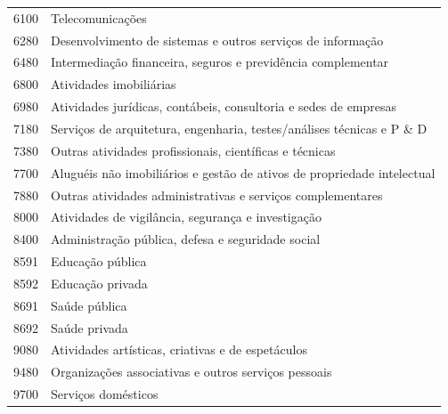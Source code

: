 \begin{longtable}{@{}lp{}@{}}
6100 & Telecomunicações \\
6280 & Desenvolvimento de sistemas e outros serviços de informação \\
6480 & Intermediação financeira, seguros e previdência complementar \\
6800 & Atividades imobiliárias \\
6980 & Atividades jurídicas, contábeis, consultoria e sedes de empresas  \\
7180 & Serviços de arquitetura, engenharia, testes/análises técnicas e P \& D \\
7380 & Outras atividades profissionais, científicas e técnicas \\
7700 & Aluguéis não imobiliários e gestão de ativos de propriedade intelectual \\
7880 & Outras atividades administrativas e serviços complementares \\
8000 & Atividades de vigilância, segurança e investigação \\
8400 & Administração pública, defesa e seguridade social \\
8591 & Educação pública \\
8592 & Educação privada \\
8691 & Saúde pública \\
8692 & Saúde privada \\
9080 & Atividades artísticas, criativas e de espetáculos \\
9480 & Organizações associativas e outros serviços pessoais \\
9700 & Serviços domésticos \\
\bottomrule\end{longtable}\normalsize
